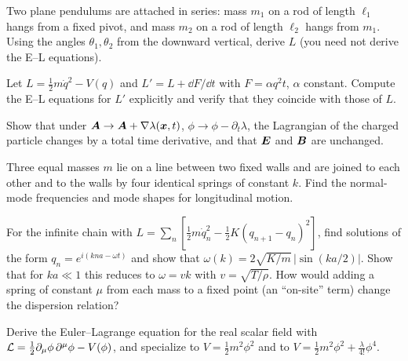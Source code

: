 \documentclass[11pt]{article}
\begin{document}
\begin{exercise}\label{ex:double}
Two plane pendulums are attached in series: mass $m_1$ on a rod of length $\ell_1$ hangs from a fixed pivot, and mass $m_2$ on a rod of length $\ell_2$ hangs from $m_1$. Using the angles $\theta_1,\theta_2$ from the downward vertical, derive $L$ (you need not derive the E--L equations).
\end{exercise}

\begin{exercise}\label{ex:totald}
Let $L=\tfrac12m\dot q^2-V(q)$ and $L'=L+\dd F/\dd t$ with $F=\alpha q^2t$, $\alpha$ constant. Compute the E--L equations for $L'$ explicitly and verify that they coincide with those of $L$.
\end{exercise}

\begin{exercise}\label{ex:gauge}
Show that under $\bm{A}\to\bm{A}+\nabla\lambda(\bm{x},t)$, $\phi\to\phi-\partial_t\lambda$, the Lagrangian of the charged particle changes by a total time derivative, and that $\bm{E}$ and $\bm{B}$ are unchanged.
\end{exercise}

\begin{exercise}\label{ex:three}
Three equal masses $m$ lie on a line between two fixed walls and are joined to each other and to the walls by four identical springs of constant $k$. Find the normal-mode frequencies and mode shapes for longitudinal motion.
\end{exercise}

\begin{exercise}\label{ex:dispersion}
For the infinite chain with $L=\sum_n[\tfrac12m\dot q_n^2-\tfrac12K(q_{n+1}-q_n)^2]$, find solutions of the form $q_n=e^{i(kna-\omega t)}$ and show that $\omega(k)=2\sqrt{K/m}\,|\sin(ka/2)|$. Show that for $ka\ll1$ this reduces to $\omega=vk$ with $v=\sqrt{T/\rho}$. How would adding a spring of constant $\mu$ from each mass to a fixed point (an ``on-site'' term) change the dispersion relation?
\end{exercise}

\begin{exercise}\label{ex:fieldEL}
Derive the Euler--Lagrange equation for the real scalar field with $\mathcal{L}=\tfrac12\partial_\mu\phi\,\partial^\mu\phi-V(\phi)$, and specialize to $V=\tfrac12m^2\phi^2$ and to $V=\tfrac12m^2\phi^2+\tfrac{\lambda}{4!}\phi^4$.
\end{exercise}
\end{document}
